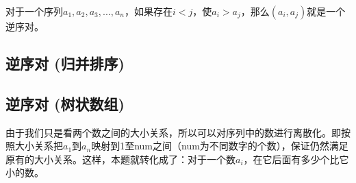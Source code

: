 对于一个序列$a_1, a_2, a_3, ... , a_n$，如果存在$i<j$，使$a_i>a_j$，那么$(a_i,a_j)$就是一个逆序对。

\subsection{逆序对 (归并排序)}


\subsection{逆序对 (树状数组)}

由于我们只是看两个数之间的大小关系，所以可以对序列中的数进行离散化。即按照大小关系把$a_1$到$a_n$映射到1至num之间（num为不同数字的个数），保证仍然满足原有的大小关系。这样，本题就转化成了：对于一个数$a_i$，在它后面有多少个比它小的数。


